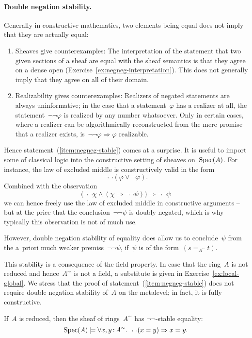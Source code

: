 \documentclass{ws-rv9x6}
\begin{document}
{\paragraph{Double negation stability.}\label{par:double-negation-stability}
Generally in constructive mathematics,
two elements being \notnot equal does not imply that they are actually equal:
\begin{enumerate}
\item Sheaves give counterexamples: The interpretation of the statement that
two given sections of a sheaf are \notnot equal with the sheaf semantics is
that they agree on a dense open (Exercise~\ref{ex:negneg-interpretation}). This
does not generally imply that they agree on all of their domain.
\item Realizability gives counterexamples: Realizers of negated statements are
always uninformative; in the case that a statement~$\varphi$ has a realizer at
all, the statement~$\neg\neg\varphi$ is realized by any number whatsoever.
Only in certain cases, where a realizer can be algorithmically reconstructed
from the mere promise that a realizer exists, is~$\neg\neg\varphi \Rightarrow
\varphi$ realizable.
\end{enumerate}

Hence statement~(\ref{item:negneg-stable}) comes at a surprise. It is useful to
import some of classical logic into the constructive setting of sheaves
on~$\mathrm{Spec}(A)$. For instance, the law of excluded middle is constructively valid
in the form
\[ \neg\neg(\varphi \vee \neg\varphi). \]
Combined with the observation
\[ \bigl(\neg\neg\chi \wedge (\chi \Rightarrow \neg\neg\psi)\bigr) \Longrightarrow \neg\neg\psi \]
we can hence freely use the law of excluded middle in constructive arguments --
but at the price that the conclusion~$\neg\neg\psi$ is doubly negated, which is
why typically this observation is not of much use.

However, double negation stability of equality does allow us to conclude~$\psi$
from the a~priori much weaker premiss~$\neg\neg\psi$, if~$\psi$ is of the
form~$(s =_{A^\sim} t)$.

This stability is a consequence of the field property. In case that the
ring~$A$ is not reduced and hence~$A^\sim$ is not a field, a substitute is given
in Exercise~\ref{ex:local-global}. We stress that the proof of
statement~(\ref{item:negneg-stable}) does not require double negation stability
of~$A$ on the metalevel; in fact, it is fully constructive.

\begin{proposition}If~$A$ is reduced, then the sheaf of rings~$A^\sim$ has $\neg\neg$-stable equality:
\[ \mathrm{Spec}(A) \models \forall x,y\,{:}\,A^\sim\mathpunct{.} \neg\neg(x = y) \Rightarrow x = y. \]
\end{proposition}

}
\end{document}
